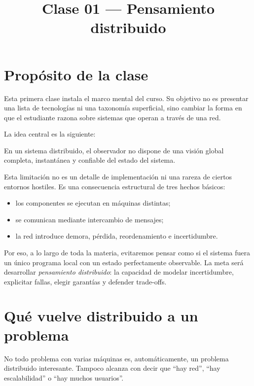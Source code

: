 \documentclass[variant=apuntes,cover=institutional,mode=screen]{ua-engineering-v6-article}
\title{Clase 01 --- Pensamiento distribuido}
\author{\UAProfessor}
\date{\UADate}
\begin{document}
\maketitle

\section{Propósito de la clase}\label{sec:proposito-de-la-clase}

Esta primera clase instala el marco mental del curso.
Su objetivo no es presentar una lista de tecnologías ni una taxonomía superficial, sino cambiar la forma en que el estudiante razona sobre sistemas que operan a través de una red.

La idea central es la siguiente:

\begin{uakeybox}
En un sistema distribuido, el observador no dispone de una visión global completa, instantánea y confiable del estado del sistema.
\end{uakeybox}

Esta limitación no es un detalle de implementación ni una rareza de ciertos entornos hostiles.
Es una consecuencia estructural de tres hechos básicos:

\begin{itemize}
\item los componentes se ejecutan en máquinas distintas;
\item se comunican mediante intercambio de mensajes;
\item la red introduce demora, pérdida, reordenamiento e incertidumbre.
\end{itemize}

Por eso, a lo largo de toda la materia, evitaremos pensar como si el sistema fuera un único programa local con un estado perfectamente observable.
La meta será desarrollar \emph{pensamiento distribuido}: la capacidad de modelar incertidumbre, explicitar fallas, elegir garantías y defender trade-offs.

\section{Qué vuelve distribuido a un problema}\label{sec:que-vuelve-distribuido-a-un-problema}

No todo problema con varias máquinas es, automáticamente, un problema distribuido interesante.
Tampoco alcanza con decir que “hay red”, “hay escalabilidad” o “hay muchos usuarios”.
\end{document}
